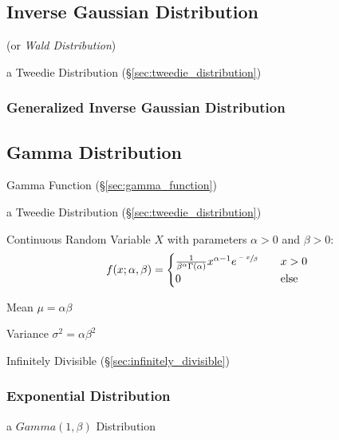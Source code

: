 \subsection{Inverse Gaussian Distribution}\label{sec:inverse_gaussian}

(or \emph{Wald Distribution})

a Tweedie Distribution (\S\ref{sec:tweedie_distribution})



\subsubsection{Generalized Inverse Gaussian Distribution}
\label{sec:generalized_inverse_gaussian}



\subsection{Gamma Distribution}\label{sec:gamma_distribution}

Gamma Function (\S\ref{sec:gamma_function})

a Tweedie Distribution (\S\ref{sec:tweedie_distribution})

Continuous Random Variable $X$ with parameters $\alpha > 0$ and $\beta
> 0$:
\[
  f(x; \alpha, \beta) =
  \begin{cases}
    \frac{1}{\beta^\alpha \Gamma(\alpha)} x^{\alpha-1} e^{\sfrac{-x}{\beta}}
      & \quad x > 0 \\
    0 & \quad\text{else} \\
  \end{cases}
\]

Mean $\mu = \alpha \beta$

Variance $\sigma^2 = \alpha \beta^2$

Infinitely Divisible (\S\ref{sec:infinitely_divisible})



\subsubsection{Exponential Distribution}\label{sec:exponential_distribution}

a $Gamma(1, \beta)$ Distribution


